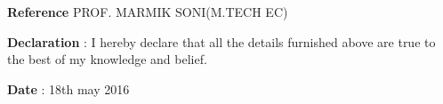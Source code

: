 \documentclass{article}
\begin{document}
\begin{flushleft}
	\vspace{0.4in}
	\textbf{Reference} \hspace{0.75in} PROF. MARMIK SONI(M.TECH EC)
\end{flushleft}

\begin{flushleft}
	\vspace{0.2in}
	\textbf{Declaration} \hspace{0.60in} : I hereby declare that all the details furnished above are true to the best of
my knowledge and belief.
\end{flushleft}

\begin{flushleft}
	\vspace{0.2in}
	\textbf{Date} : 18th may 2016
\end{flushleft}
\end{document}
